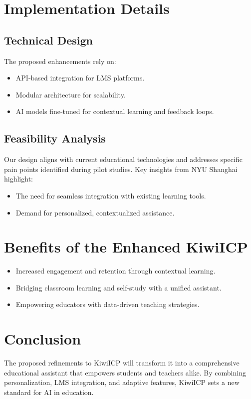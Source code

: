 \documentclass{article}
\begin{document}
\section{Implementation Details}
\subsection{Technical Design}
The proposed enhancements rely on:
\begin{itemize}
    \item API-based integration for LMS platforms.
    \item Modular architecture for scalability.
    \item AI models fine-tuned for contextual learning and feedback loops.
\end{itemize}

\subsection{Feasibility Analysis}
Our design aligns with current educational technologies and addresses specific pain points identified during pilot studies. Key insights from NYU Shanghai highlight:
\begin{itemize}
    \item The need for seamless integration with existing learning tools.
    \item Demand for personalized, contextualized assistance.
\end{itemize}

\section{Benefits of the Enhanced KiwiICP}
\begin{itemize}
    \item Increased engagement and retention through contextual learning.
    \item Bridging classroom learning and self-study with a unified assistant.
    \item Empowering educators with data-driven teaching strategies.
\end{itemize}

\section{Conclusion}
The proposed refinements to KiwiICP will transform it into a comprehensive educational assistant that empowers students and teachers alike. By combining personalization, LMS integration, and adaptive features, KiwiICP sets a new standard for AI in education.
\end{document}
